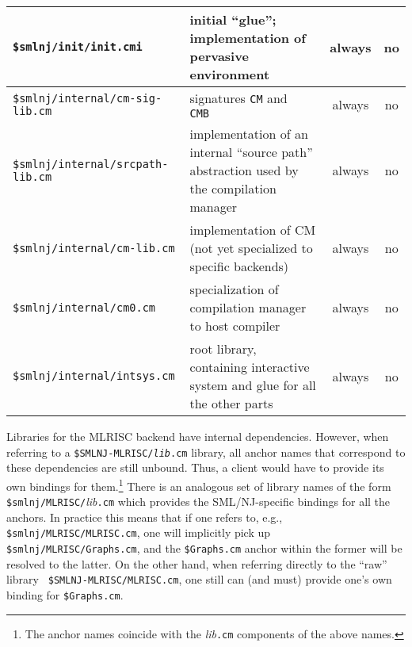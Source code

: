 \begin{small}
\begin{center}
\begin{tabular}{p{2.5in}||p{2.6in}|c|c}
\hline \hline
{\tt \$smlnj/init/init.cmi} & initial ``glue''; implementation of
pervasive environment & always & no \\
\hline \hline
{\tt \$smlnj/internal/cm-sig-lib.cm} & signatures {\tt CM} and {\tt
CMB} & always & no \\
\hline
{\tt \$smlnj/internal/srcpath-lib.cm} & implementation of an internal
``source path'' abstraction used by the compilation manager & always &
no \\
\hline
{\tt \$smlnj/internal/cm-lib.cm} & implementation of CM 
(not yet specialized to specific backends) & always & no \\
\hline
{\tt \$smlnj/internal/cm0.cm} & specialization of compilation manager
to host compiler & always &
no \\
\hline
{\tt \$smlnj/internal/intsys.cm} & root library, containing
interactive system and glue for all the other parts & always &
no
\end{tabular}
\end{center}
\end{small}

Libraries for the MLRISC backend have internal dependencies.  However,
when referring to a {\tt \$SMLNJ-MLRISC/{\it lib}.cm} library, all
anchor names that correspond to these dependencies are still unbound.
Thus, a client would have to provide its own bindings for
them.\footnote{The anchor names coincide with the {\it lib}{\tt .cm}
components of the above names.} There is an analogous set of library
names of the form {\tt \$smlnj/MLRISC/}{\it lib}{\tt .cm} which
provides the SML/NJ-specific bindings for all the anchors.  In
practice this means that if one refers to, e.g., {\tt
\$smlnj/MLRISC/MLRISC.cm}, one will implicitly pick up {\tt
\$smlnj/MLRISC/Graphs.cm}, and the {\tt \$Graphs.cm} anchor within the
former will be resolved to the latter.  On the other hand, when
referring directly to the ``raw'' library {\tt
\$SMLNJ-MLRISC/MLRISC.cm}, one still can (and must) provide one's own
binding for {\tt \$Graphs.cm}.
